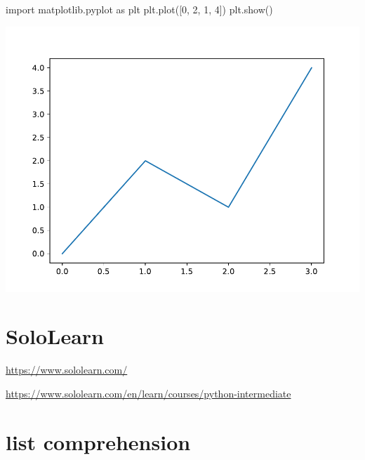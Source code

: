\documentclass[
]{book}
\newenvironment{Shaded}{\begin{snugshade}}{\end{snugshade}}
\newcommand{\CommentTok}[1]{\textcolor[rgb]{0.56,0.35,0.01}{\textit{#1}}}
\newcommand{\DecValTok}[1]{\textcolor[rgb]{0.00,0.00,0.81}{#1}}
\newcommand{\ImportTok}[1]{#1}
\newcommand{\NormalTok}[1]{#1}
\theoremstyle{definition}
\theoremstyle{definition}
\theoremstyle{definition}
\theoremstyle{definition}
\theoremstyle{remark}
\begin{document}
\begin{Shaded}
\end{Shaded}

\begin{Shaded}
\begin{Highlighting}[]
\ImportTok{import}\NormalTok{ matplotlib.pyplot }\ImportTok{as}\NormalTok{ plt}
\NormalTok{plt.plot([}\DecValTok{0}\NormalTok{, }\DecValTok{2}\NormalTok{, }\DecValTok{1}\NormalTok{, }\DecValTok{4}\NormalTok{])}
\NormalTok{plt.show()}
\end{Highlighting}
\end{Shaded}

\includegraphics{202401292317-Python_files/figure-latex/unnamed-chunk-9-1.pdf}

\section{SoloLearn}\label{sololearn}

\url{https://www.sololearn.com/}

\url{https://www.sololearn.com/en/learn/courses/python-intermediate}

\section{list comprehension}\label{list-comprehension}
\end{document}

